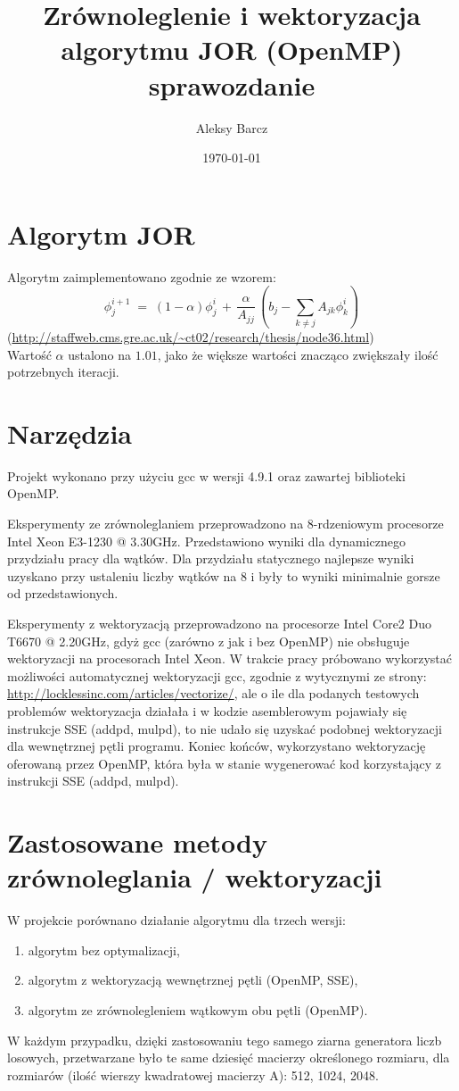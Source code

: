 \documentclass[11pt,a4paper]{article}
\date {\today}
\author {Aleksy Barcz}
\title{Zrównoleglenie i wektoryzacja algorytmu JOR (OpenMP)\\sprawozdanie}
\begin{document}
\maketitle

\section{Algorytm JOR}
Algorytm zaimplementowano zgodnie ze wzorem:
\begin{equation}
\phi_j^{i+1} \; = \; (1-\alpha) \phi_j^i \, + \, \frac{\alpha}
{A_{jj}} \, \left(b_j - \sum_{k\not=j} A_{jk}
\phi_k^i\right)
\end{equation}
(\url{http://staffweb.cms.gre.ac.uk/~ct02/research/thesis/node36.html})\\
Wartość $\alpha$ ustalono na $1.01$, jako że większe wartości znacząco zwiększały ilość potrzebnych iteracji.

\section{Narzędzia}
Projekt wykonano przy użyciu gcc w wersji 4.9.1 oraz zawartej biblioteki OpenMP. 

Eksperymenty ze zrównoleglaniem przeprowadzono na 8-rdzeniowym procesorze Intel Xeon  E3-1230 @ 3.30GHz. Przedstawiono wyniki dla dynamicznego przydziału pracy dla wątków. Dla przydziału statycznego najlepsze wyniki uzyskano przy ustaleniu liczby wątków na 8 i były to wyniki minimalnie gorsze od przedstawionych.

Eksperymenty z wektoryzacją przeprowadzono na procesorze Intel Core2 Duo T6670 @ 2.20GHz, gdyż gcc (zarówno z jak i bez OpenMP) nie obsługuje wektoryzacji na procesorach Intel Xeon. W trakcie pracy próbowano wykorzystać możliwości automatycznej wektoryzacji gcc, zgodnie z wytycznymi ze strony: \url{http://locklessinc.com/articles/vectorize/}, ale o ile dla podanych testowych problemów wektoryzacja działała i w kodzie asemblerowym pojawiały się instrukcje SSE (addpd, mulpd), to nie udało się uzyskać podobnej wektoryzacji dla wewnętrznej pętli programu. Koniec końców, wykorzystano wektoryzację oferowaną przez OpenMP, która była w stanie wygenerować kod korzystający z instrukcji SSE (addpd, mulpd).

\section{Zastosowane metody zrównoleglania / wektoryzacji}
W projekcie porównano działanie algorytmu dla trzech wersji:
\begin{enumerate}
	\item algorytm bez optymalizacji,
	\item algorytm z wektoryzacją wewnętrznej pętli (OpenMP, SSE),
	\item algorytm ze zrównolegleniem wątkowym obu pętli (OpenMP).
\end{enumerate}
W każdym przypadku, dzięki zastosowaniu tego samego ziarna generatora liczb losowych, przetwarzane było te same dziesięć macierzy określonego rozmiaru, dla rozmiarów (ilość wierszy kwadratowej macierzy A): 512, 1024, 2048.
\end{document}
